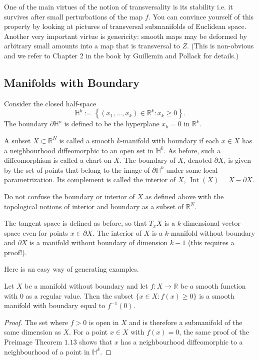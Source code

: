 \documentclass[a4paper, 10pt, twocolumn]{amsart}
\begin{document}
One of the main virtues of the notion of transversality is its stability i.e. it survives after small perturbations of the map $f$. You can convince yourself of this property by looking at pictures of transversal submanifolds of Euclidean space. Another very important virtue is genericity: smooth maps may be deformed by arbitrary small amounts into a map that is transversal to $Z$. (This is non-obvious and we refer to Chapter 2 in the book by Guillemin and Pollack for details.)

\subsection{Manifolds with Boundary}

Consider the closed half-space
$$
\mathbb{H}^{k}:=\left\{\left(x_{1}, \ldots, x_{k}\right) \in \mathbb{R}^{k}: x_{k} \geq 0\right\}.
$$
The boundary $\partial \mathbb{H}^{n}$ is defined to be the hyperplane $x_{k}=0$ in $\mathbb{R}^{k}$.

\begin{definition}
    A subset $X \subset \mathbb{R}^{N}$ is called a smooth $k$-manifold with boundary if each $x \in X$ has a neighbourhood diffeomorphic to an open set in $\mathbb{H}^{k}$. As before, such a diffeomorphism is called a chart on $X$. The boundary of $X$, denoted $\partial X$, is given by the set of points that belong to the image of $\partial \mathbb{H}^{k}$ under some local parametrization. Its complement is called the interior of $X$, $\operatorname{Int}(X)=X-\partial X$.
\end{definition}

\begin{remark}[Warning]
    Do not confuse the boundary or interior of $X$ as defined above with the topological notions of interior and boundary as a subset of $\mathbb{R}^{N}$.
\end{remark}


The tangent space is defined as before, so that $T_{x} X$ is a $k$-dimensional vector space even for points $x \in \partial X$. The interior of $X$ is a $k$-manifold without boundary and $\partial X$ is a manifold without boundary of dimension $k-1$ (this requires a proof!).

Here is an easy way of generating examples.

\begin{lemma}
    Let $X$ be a manifold without boundary and let $f: X \rightarrow \mathbb{R}$ be $a$ smooth function with 0 as a regular value. Then the subset $\{x \in X: f(x) \geq 0\}$ is a smooth manifold with boundary equal to $f^{-1}(0)$.
\end{lemma}
\begin{proof}
    The set where $f>0$ is open in $X$ and is therefore a submanifold of the same dimension as $X$. For a point $x \in X$ with $f(x)=0$, the same proof of the Preimage Theorem $1.13$ shows that $x$ has a neighbourhood diffeomorphic to a neighbourhood of a point in $\mathbb{H}^{k}$.
\end{proof}
\end{document}
